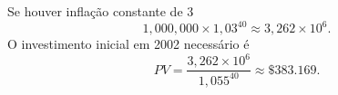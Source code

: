 Se houver inflação constante de 3%
\[
1{,}000{,}000\times1{,}03^{40}\approx3{,}262\times10^{6}.
\]
O investimento inicial em 2002 necessário é
\[
PV=\frac{3{,}262\times10^{6}}{1{,}055^{40}}\approx\$383.169.
\]